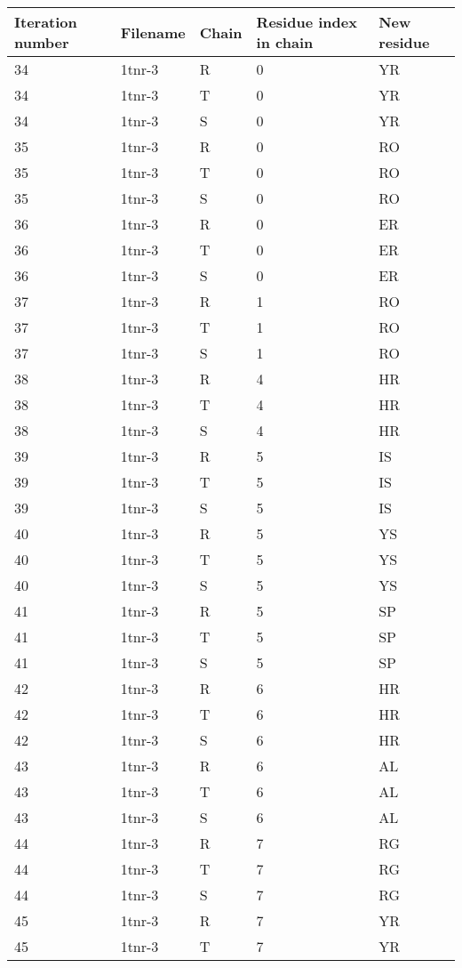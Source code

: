 \begin{longtable}[l]{l|l|l|l|l}
	Iteration number & Filename & Chain & Residue index in chain & New residue\\ \hline
	34 & 1tnr-3 & R & 0 & YR \\
	34 & 1tnr-3 & T & 0 & YR \\
	34 & 1tnr-3 & S & 0 & YR \\
	35 & 1tnr-3 & R & 0 & RO \\
	35 & 1tnr-3 & T & 0 & RO \\
	35 & 1tnr-3 & S & 0 & RO \\
	36 & 1tnr-3 & R & 0 & ER \\
	36 & 1tnr-3 & T & 0 & ER \\
	36 & 1tnr-3 & S & 0 & ER \\
	37 & 1tnr-3 & R & 1 & RO \\
	37 & 1tnr-3 & T & 1 & RO \\
	37 & 1tnr-3 & S & 1 & RO \\
	38 & 1tnr-3 & R & 4 & HR \\
	38 & 1tnr-3 & T & 4 & HR \\
	38 & 1tnr-3 & S & 4 & HR \\
	39 & 1tnr-3 & R & 5 & IS \\
	39 & 1tnr-3 & T & 5 & IS \\
	39 & 1tnr-3 & S & 5 & IS \\
	40 & 1tnr-3 & R & 5 & YS \\
	40 & 1tnr-3 & T & 5 & YS \\
	40 & 1tnr-3 & S & 5 & YS \\
	41 & 1tnr-3 & R & 5 & SP \\
	41 & 1tnr-3 & T & 5 & SP \\
	41 & 1tnr-3 & S & 5 & SP \\
	42 & 1tnr-3 & R & 6 & HR \\
	42 & 1tnr-3 & T & 6 & HR \\
	42 & 1tnr-3 & S & 6 & HR \\
	43 & 1tnr-3 & R & 6 & AL \\
	43 & 1tnr-3 & T & 6 & AL \\
	43 & 1tnr-3 & S & 6 & AL \\
	44 & 1tnr-3 & R & 7 & RG \\
	44 & 1tnr-3 & T & 7 & RG \\
	44 & 1tnr-3 & S & 7 & RG \\
	45 & 1tnr-3 & R & 7 & YR \\
	45 & 1tnr-3 & T & 7 & YR \\

\end{longtable}
